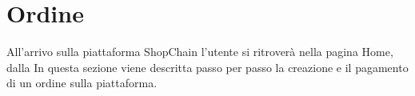 \section{Ordine}

All'arrivo sulla piattaforma ShopChain l'utente si ritroverà nella pagina Home, dalla 
In questa sezione viene descritta passo per passo la creazione e il pagamento di un ordine sulla piattaforma.

